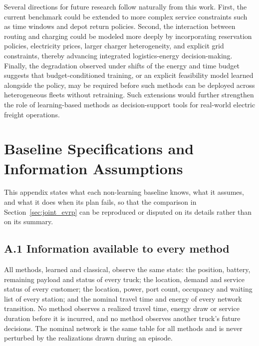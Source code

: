 \documentclass[a4paper,fleqn]{cas-sc}
\begin{document}
Several directions for future research follow naturally from this work. First, the current benchmark could be extended to more complex service constraints such as time windows and depot return policies. Second, the interaction between routing and charging could be modeled more deeply by incorporating reservation policies, electricity prices, larger charger heterogeneity, and explicit grid constraints, thereby advancing integrated logistics-energy decision-making. 
Finally, the degradation observed under shifts of the energy and time budget suggests that budget-conditioned training, or an explicit feasibility model learned alongside the policy, may be required before such methods can be deployed across heterogeneous fleets without retraining. 
Such extensions would further strengthen the role of learning-based methods as decision-support tools for real-world electric freight operations. 



%
% 

\appendix

\section{Baseline Specifications and Information Assumptions}\label{app:baselines}

This appendix states what each non-learning baseline knows, what it assumes, and
what it does when its plan fails, so that the comparison in
Section~\ref{sec:joint_evrp} can be reproduced or disputed on its details rather
than on its summary.

\subsection*{A.1 Information available to every method}

All methods, learned and classical, observe the same state: the position,
battery, remaining payload and status of every truck; the location, demand and
service status of every customer; the location, power, port count, occupancy and
waiting list of every station; and the nominal travel time and energy of every
network transition. No method observes a realized travel time, energy draw or
service duration before it is incurred, and no method observes another truck's
future decisions. The nominal network is the same table for all methods and is
never perturbed by the realizations drawn during an episode.
\end{document}
